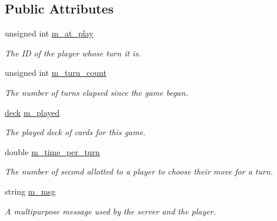 \subsection*{\-Public \-Attributes}
\begin{DoxyCompactItemize}
\item 
\hypertarget{class_uno___state_a7c0374eff2c4a4b3eed4b7eebb72a81a}{
unsigned int \hyperlink{class_uno___state_a7c0374eff2c4a4b3eed4b7eebb72a81a}{m\-\_\-at\-\_\-play}}
\label{class_uno___state_a7c0374eff2c4a4b3eed4b7eebb72a81a}

\begin{DoxyCompactList}\small\item\em \-The \-I\-D of the player whose turn it is. \end{DoxyCompactList}\item 
\hypertarget{class_uno___state_adba4113bb99a08f6804eeb348ed3822c}{
unsigned int \hyperlink{class_uno___state_adba4113bb99a08f6804eeb348ed3822c}{m\-\_\-turn\-\_\-count}}
\label{class_uno___state_adba4113bb99a08f6804eeb348ed3822c}

\begin{DoxyCompactList}\small\item\em \-The number of turns elapsed since the game began. \end{DoxyCompactList}\item 
\hyperlink{uno__deck_8h_ab634a15f4d19d3af113a71241b79c408}{deck} \hyperlink{class_uno___state_ad46fac2ea86f2fd2249675db49c35b6c}{m\-\_\-played}
\begin{DoxyCompactList}\small\item\em \-The played deck of cards for this game. \end{DoxyCompactList}\item 
\hypertarget{class_uno___state_a80b2bee84fda6bdd9c37bc2309c81608}{
double \hyperlink{class_uno___state_a80b2bee84fda6bdd9c37bc2309c81608}{m\-\_\-time\-\_\-per\-\_\-turn}}
\label{class_uno___state_a80b2bee84fda6bdd9c37bc2309c81608}

\begin{DoxyCompactList}\small\item\em \-The number of second allotted to a player to choose their move for a turn. \end{DoxyCompactList}\item 
\hypertarget{class_uno___state_ab345f325e023d89b0c7c3f8bf3a629da}{
string \hyperlink{class_uno___state_ab345f325e023d89b0c7c3f8bf3a629da}{m\-\_\-msg}}
\label{class_uno___state_ab345f325e023d89b0c7c3f8bf3a629da}

\begin{DoxyCompactList}\small\item\em \-A multipurpose message used by the server and the player. \end{DoxyCompactList}\end{DoxyCompactItemize}


